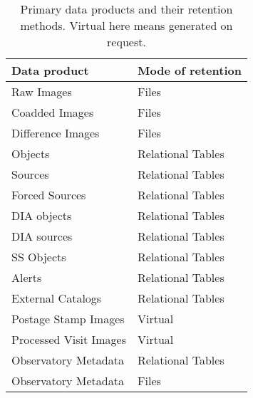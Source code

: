 
\begin{table}
\caption{Primary data products and their retention methods. Virtual here means generated on request. \label{tab:prods}}
\begin{center}
\begin{tabular}{|l|l|}\hline
\textbf{Data product}&\textbf{Mode of retention}\\\hline
Raw Images  & Files \\\hline
Coadded Images & Files \\\hline
Difference Images  & Files \\\hline
Objects & Relational Tables \\\hline
Sources  & Relational Tables \\\hline
Forced Sources & Relational Tables \\\hline
DIA objects & Relational Tables \\\hline
DIA sources  & Relational Tables \\\hline
SS Objects  & Relational Tables \\\hline
Alerts & Relational Tables \\\hline
External Catalogs & Relational Tables \\\hline
Postage Stamp Images & Virtual \\\hline
Processed Visit Images & Virtual \\\hline
Observatory Metadata  & Relational Tables \\\hline
Observatory Metadata & Files \\\hline
      \end{tabular}
\end{center}
\end{table}
